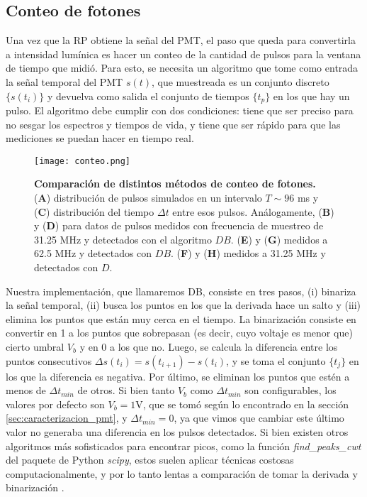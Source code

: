 \subsection{Conteo de fotones}


Una vez que la RP obtiene la señal del PMT, el paso que queda para convertirla a intensidad lumínica es hacer un conteo de la cantidad de pulsos para la ventana de tiempo que midió.
Para esto, se necesita un algoritmo que tome como entrada la señal temporal del PMT $s(t)$, que muestreada es un conjunto discreto $\{s(t_i)\}$ y devuelva como salida el conjunto de tiempos $\{t_p\}$ en los que hay un pulso.
El algoritmo debe cumplir con dos condiciones: tiene que ser preciso para no sesgar los espectros y tiempos de vida, y tiene que ser rápido para que las mediciones se puedan hacer en tiempo real.

\begin{figure}
    \centering
    \texttt{[image: conteo.png]}
    \caption{\textbf{Comparación de distintos métodos de conteo de fotones.} (\textbf{A}) distribución de pulsos simulados en un intervalo $T \sim 96$ ms y (\textbf{C}) distribución del tiempo $\Delta t$ entre esos pulsos. Análogamente, (\textbf{B}) y (\textbf{D}) para datos de pulsos medidos con frecuencia de muestreo de 31.25 MHz y detectados con el algoritmo $DB$. (\textbf{E}) y (\textbf{G}) medidos a 62.5 MHz y detectados con $DB$. (\textbf{F}) y (\textbf{H}) medidos a 31.25 MHz y detectados con $D$.}
    \label{fig:conteo}
\end{figure}

Nuestra implementación, que llamaremos DB, consiste en tres pasos, (i) binariza la señal temporal, (ii) busca los puntos en los que la derivada hace un salto y (iii) elimina los puntos que están muy cerca en el tiempo.
La binarización consiste en convertir en 1 a los puntos que sobrepasan (es decir, cuyo voltaje es menor que) cierto umbral $V_b$ y en 0 a los que no. 
Luego, se calcula la diferencia entre los puntos consecutivos $\Delta s(t_i) = s(t_{i+1}) - s(t_i)$, y se toma el conjunto $\{t_j\}$ en los que la diferencia es negativa.
Por último, se eliminan los puntos que estén a menos de $\Delta t_{min}$ de otros.
Si bien tanto $V_b$ como $\Delta t_{min}$ son configurables, los valores por defecto son $V_b = 1$V, que se tomó según lo encontrado en la sección \ref{sec:caracterizacion_pmt}, y $\Delta t_{min} = 0$, ya que vimos que cambiar este último valor no generaba una diferencia en los pulsos detectados.
Si bien existen otros algoritmos más sofisticados para encontrar picos, como la función \textit{find\_peaks\_cwt} del paquete de Python \textit{scipy}, estos suelen aplicar técnicas costosas computacionalmente, y por lo tanto lentas a comparación de tomar la derivada y binarización \cite{du_improved_2006}.

